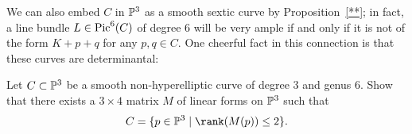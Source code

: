 We can also embed $C$ in $\PP^3$ as a smooth sextic curve by Proposition~\ref{**}; in fact, a line bundle $L \in \pic^6(C)$ of degree 6 will be very ample if and only if it is not of the form $K+p+q$ for any $p, q \in C$. One cheerful fact in this connection is that these curves are determinantal:

\begin{exercise}
Let $C \subset \PP^3$ be a smooth non-hyperelliptic curve of degree 3 and genus 6. Show that there exists a $3 \times 4$ matrix $M$ of linear forms on $\PP^3$ such that 
$$
C = \{ p \in \PP^3 \mid \rank(M(p)) \leq 2 \}.
$$
\end{exercise}




